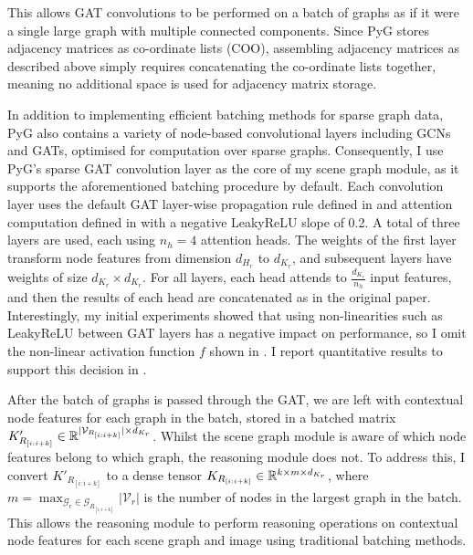 This allows GAT convolutions to be performed on a batch of graphs as if it were a single large graph with multiple connected components. Since PyG stores adjacency matrices as co-ordinate lists (COO), assembling adjacency matrices as described above simply requires concatenating the co-ordinate lists together, meaning no additional space is used for adjacency matrix storage.

In addition to implementing efficient batching methods for sparse graph data, PyG also contains a variety of node-based convolutional layers including GCNs and GATs, optimised for computation over sparse graphs. Consequently, I use PyG's sparse GAT convolution layer as the core of my scene graph module, as it supports the aforementioned batching procedure by default. Each convolution layer uses the default GAT layer-wise propagation rule defined in \equationautorefname{ \ref{equation:gat_propagation_rule}} and attention computation defined in \equationautorefname{ \ref{equation:gat_attention_computation}} with a negative LeakyReLU slope of 0.2. A total of three layers are used, each using \(n_h = 4\) attention heads. The weights of the first layer transform node features from dimension \(d_{H_r}\) to \(d_{K_r}\), and subsequent layers have weights of size \(d_{K_r} \times d_{K_r}\). For all layers, each head attends to \(\frac{d_{K_r}}{n_h}\) input features, and then the results of each head are concatenated as in the original paper. Interestingly, my initial experiments showed that using non-linearities such as LeakyReLU between GAT layers has a negative impact on performance, so I omit the non-linear activation function \(f\) shown in \equationautorefname{ \ref{equation:gat_propagation_rule}}. I report quantitative results to support this decision in \sectionautorefname{ \ref{subsec:scene_graph_module_ablations}}.
 
After the batch of graphs is passed through the GAT, we are left with contextual node features for each graph in the batch, stored in a batched matrix \(K'_{R_{[i:i+k]}} \in \mathbb{R}^{|\mathcal{V}_{R_{[i:i+k]}}| \times d_{K_r}}\). Whilst the scene graph module is aware of which node features belong to which graph, the reasoning module does not. To address this, I convert \(K'_{R_{[i:i+k]}}\) to a dense tensor \(K_{R_{[i:i+k]}} \in \mathbb{R}^{k \times m \times d_{K_r}}\), where \(m = \max_{\mathcal{G}_r \in \mathcal{G}_{R_{[i:i+k]}}} |\mathcal{V}_r|\) is the number of nodes in the largest graph in the batch. This allows the reasoning module to perform reasoning operations on contextual node features for each scene graph and image using traditional batching methods.
 
